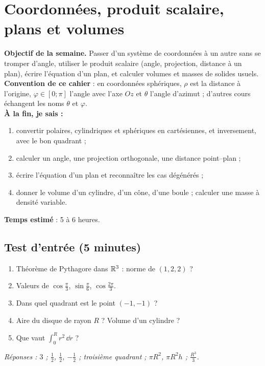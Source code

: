 \clearpage
\section{Coordonnées, produit scalaire, plans et volumes}
\renewcommand{\titrecourant}{Semaine 5}

\begin{boussole}
\textbf{Objectif de la semaine.} Passer d'un système de coordonnées à un autre sans se tromper d'angle, utiliser le produit scalaire (angle, projection, distance à un plan), écrire l'équation d'un plan, et calculer volumes et masses de solides usuels.\\
\textbf{Convention de ce cahier} \verif : en coordonnées sphériques, $\rho$ est la distance à l'origine, $\varphi\in[0;\pi]$ l'angle avec l'axe $Oz$ et $\theta$ l'angle d'azimut ; d'autres cours échangent les noms $\theta$ et $\varphi$.\\
\textbf{À la fin, je sais :}
\begin{enumerate}
 \item convertir polaires, cylindriques et sphériques en cartésiennes, et inversement, avec le bon quadrant ;
 \item calculer un angle, une projection orthogonale, une distance point--plan ;
 \item écrire l'équation d'un plan et reconnaître les cas dégénérés ;
 \item donner le volume d'un cylindre, d'un cône, d'une boule ; calculer une masse à densité variable.
\end{enumerate}
\textbf{Temps estimé} : 5 à 6 heures.
\end{boussole}

\subsection{Test d'entrée (5 minutes)}
\begin{enumerate}
 \item Théorème de Pythagore dans $\mathbb{R}^3$ : norme de $(1,2,2)$ ?
 \item Valeurs de $\cos\frac\pi3$, $\sin\frac\pi6$, $\cos\frac{2\pi}3$.
 \item Dans quel quadrant est le point $(-1,-1)$ ?
 \item Aire du disque de rayon $R$ ? Volume d'un cylindre ?
 \item Que vaut $\int_0^R r^2\,\dd r$ ?
\end{enumerate}
\textit{Réponses : $3$ ; $\frac12$, $\frac12$, $-\frac12$ ; troisième quadrant ; $\pi R^2$, $\pi R^2h$ ; $\frac{R^3}3$.}

